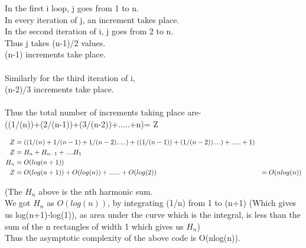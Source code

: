 \documentclass[a4paper,10pt]{article}
\newenvironment{answer}[1][height fill] {
    \begin{tcolorbox}[#1]
}
{
    \end{tcolorbox}
}
\begin{document}
\begin{answer}
    In the first i loop, j goes from 1 to n.\\
    In every iteration of j, an increment takes place.\\
    \vspace{\baselineskip}
    In the second iteration of i, j goes from 2 to n.\\
    Thus j takes (n-1)/2 values.\\
    (n-1) increments take place.\\\\
    \vspace{\baselineskip}
    Similarly for the third iteration of i,\\
    (n-2)/3 increments take place.\\\\
    \vspace{\baselineskip}
    Thus the total number of increments taking place are-\\ ((1/(n))+(2/(n-1))+(3/(n-2))+.....+n)= Z
    
    \begin{align*}
        
        Z &=((1/(n)+1/(n-1)+1/(n-2).....)+((1/(n-1))+(1/(n-2))....)+.....+1)\\
        \vspace{\baselineskip}
        Z &=H_n + H_{n-1} + .... H_1\\
        
        H_n&=O(log(n+1))\\
        
        Z &= O(log(n+1))+O(log(n))+......+ O(log(2))
        &= O(nlog(n))
        
    \end{align*}
    
    (The $H_n$ above is the nth harmonic sum. \\We got $H_n$ as $O(log(n))$, by integrating (1/n) from 1 to (n+1) (Which gives us log(n+1)-log(1)), as area under the curve which is the integral, is less than the sum of the n rectangles of width 1 which gives us $H_n$)\\
    Thus the asymptotic complexity of the above code is O(nlog(n)).\\
\end{answer}
\end{document}
